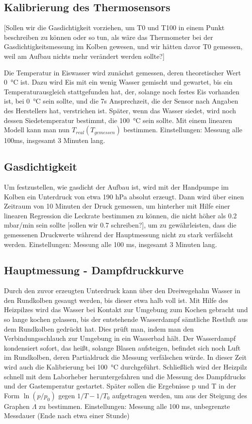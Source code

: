 \documentclass[]{article}
\begin{document}
\subsection {Kalibrierung des Thermosensors}  {\color{red}[Sollen wir die Gasdichtigkeit vorziehen, um T0 und T100 in einem Punkt beschreiben zu können oder so tun, als wäre das Thermometer bei der Gasdichtigkeitsmessung im Kolben gewesen, und wir hätten davor T0 gemessen, weil am Aufbau nichts mehr verändert werden sollte?]}

Die Temperatur in Eiswasser wird zunächst gemessen, deren theoretischer Wert \SI{0}{\celsius} ist. Dazu wird Eis mit ein wenig Wasser gemischt und gewartet, bis ein Temperaturausgleich stattgefunden hat, der, solange noch festes Eis vorhanden ist, bei \SI{0}{\celsius} sein sollte, und die 7s Ansprechzeit, die der Sensor nach Angaben des Herstellers hat, verstrichen ist. Später, wenn das Wasser siedet, wird noch dessen Siedetemperatur bestimmt, die \SI{100}{\celsius} sein sollte. Mit einem linearen Modell kann man nun $T_{real}(T_{gemessen})$ bestimmen.
Einstellungen: Messung alle 100ms, insgesamt 3 Minuten lang.

\subsection{Gasdichtigkeit}
Um festzustellen, wie gasdicht der Aufbau ist, wird mit der Handpumpe im Kolben ein Unterdruck von etwa 190 hPa absolut erzeugt. Dann wird über einen Zeitraum von 10 Minuten der Druck gemessen, um hinterher mit Hilfe einer linearen Regression die Leckrate bestimmen zu können, die nicht höher als 0.2 mbar/min sein sollte {\color{red}[sollen wir 0.7 schreiben?]}, um zu gewährleisten, dass die gemessenen Druckwerte während der Hauptmessung nicht zu stark verfälscht werden. 
Einstellungen: Messung alle 100 ms, insgesamt 3 Minuten lang.


\subsection{Hauptmessung - Dampfdruckkurve}
Durch den zuvor erzeugten Unterdruck kann über den Dreiwegehahn Wasser in den Rundkolben gesaugt werden, bis dieser etwa halb voll ist. Mit Hilfe des Heizpilzes wird das Wasser bei Kontakt zur Umgebung zum Kochen gebracht und so lange kochen gelassen, bis der entstehende Wasserdampf sämtliche Restluft aus dem Rundkolben gedrückt hat. Dies prüft man, indem man den Verbindungsschlauch zur Umgebung in ein Wasserbad hält. Der Wasserdampf kondensiert sofort, das heißt, solange Blasen aufsteigen, befindet sich noch Luft im Rundkolben, deren Partialdruck die Messung verfälschen würde. In dieser Zeit wird auch die Kalibrierung bei \SI{100}{\celsius} durchgeführt. Schließlich wird der Heizpilz schnell mit dem Laborheber heruntergefahren und die Messung des Dampfdrucks und der Gastemperatur gestartet. Später sollen die Ergebnisse p und T in der Form $\ln(p/p_0)$ gegen $1/T-1/T_0$ aufgetragen werden, um aus der Steigung des Graphen $\Lambda$ zu bestimmen.
Einstellungen: Messung alle 100 ms, unbegrenzte Messdauer (Ende nach etwa einer Stunde)\\
\end{document}
